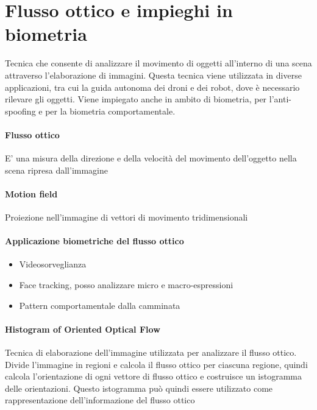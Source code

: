 \section{Flusso ottico e impieghi in biometria}
Tecnica che consente di analizzare il movimento di oggetti all'interno di una scena attraverso l'elaborazione di immagini. Questa tecnica viene utilizzata in diverse applicazioni, tra cui la guida autonoma dei droni e dei robot, dove è necessario rilevare gli oggetti. Viene impiegato anche in ambito di biometria, per l'anti-spoofing e per la biometria comportamentale. 

\paragraph{Flusso ottico} 
E' una misura della direzione e della velocità del movimento dell'oggetto nella scena ripresa dall'immagine

\paragraph{Motion field}
Proiezione nell’immagine di vettori di movimento tridimensionali

\paragraph{Applicazione biometriche del flusso ottico}
\begin{itemize}
    \item Videosorveglianza
    \item Face tracking, posso analizzare micro e macro-espressioni
    \item Pattern comportamentale dalla camminata
\end{itemize}

\paragraph{Histogram of Oriented Optical Flow}
Tecnica di elaborazione dell'immagine utilizzata per analizzare il flusso ottico. Divide l'immagine in regioni e calcola il flusso ottico per ciascuna regione, quindi calcola l'orientazione di ogni vettore di flusso ottico e costruisce un istogramma delle orientazioni. Questo istogramma può quindi essere utilizzato come rappresentazione dell'informazione del flusso ottico

\newpage
